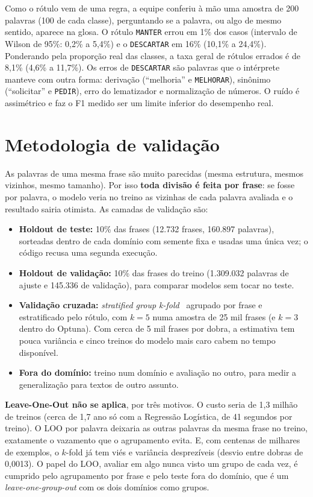 \documentclass[12pt]{article}
\begin{document}
Como o rótulo vem de uma regra, a equipe conferiu à mão uma amostra de 200 palavras (100 de cada
classe), perguntando se a palavra, ou algo de mesmo sentido, aparece na glosa. O rótulo
\texttt{MANTER} errou em 1\% dos casos (intervalo de Wilson de 95\%: 0,2\% a 5,4\%) e o
\texttt{DESCARTAR} em 16\% (10,1\% a 24,4\%). Ponderando pela proporção real das classes, a taxa geral
de rótulos errados é de 8,1\% (4,6\% a 11,7\%). Os erros de \texttt{DESCARTAR} são palavras que o
intérprete manteve com outra forma: derivação (``melhoria'' e \texttt{MELHORAR}), sinônimo
(``solicitar'' e \texttt{PEDIR}), erro do lematizador e normalização de números. O ruído é
assimétrico e faz o F1 medido ser um limite inferior do desempenho real.

\section{Metodologia de validação}\label{sec:validacao}

As palavras de uma mesma frase são muito parecidas (mesma estrutura, mesmos vizinhos, mesmo tamanho).
Por isso \textbf{toda divisão é feita por frase}: se fosse por palavra, o modelo veria no treino as
vizinhas de cada palavra avaliada e o resultado sairia otimista. As camadas de validação são:

\begin{itemize}
\item \textbf{Holdout de teste:} 10\% das frases (12.732 frases, 160.897 palavras), sorteadas dentro
  de cada domínio com semente fixa e usadas uma única vez; o código recusa uma segunda execução.
\item \textbf{Holdout de validação:} 10\% das frases do treino (1.309.032 palavras de ajuste e 145.336
  de validação), para comparar modelos sem tocar no teste.
\item \textbf{Validação cruzada:} \emph{stratified group k-fold}~\cite{kohavi:95} agrupado por frase e
  estratificado pelo rótulo, com $k=5$ numa amostra de 25 mil frases (e $k=3$ dentro do Optuna). Com
  cerca de 5 mil frases por dobra, a estimativa tem pouca variância e cinco treinos do modelo mais caro
  cabem no tempo disponível.
\item \textbf{Fora do domínio:} treino num domínio e avaliação no outro, para medir a generalização
  para textos de outro assunto.
\end{itemize}

\textbf{Leave-One-Out não se aplica}, por três motivos. O custo seria de 1,3 milhão de treinos (cerca
de 1,7 ano só com a Regressão Logística, de 41 segundos por treino). O LOO por palavra deixaria as
outras palavras da mesma frase no treino, exatamente o vazamento que o agrupamento evita. E, com
centenas de milhares de exemplos, o $k$-fold já tem viés e variância desprezíveis (desvio entre dobras
de 0,0013). O papel do LOO, avaliar em algo nunca visto um grupo de cada vez, é cumprido pelo
agrupamento por frase e pelo teste fora do domínio, que é um \emph{leave-one-group-out} com os dois
domínios como grupos.
\end{document}
